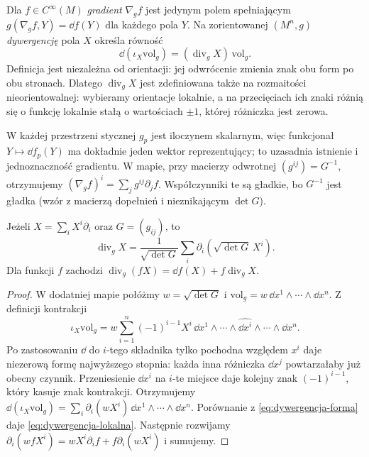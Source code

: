 \begin{definicja}
\label{def:gradient-dywergencja}
Dla $f\in C^\infty(M)$ \emph{gradient} $\nabla_g f$
jest jedynym polem spełniającym
$g(\nabla_g f,Y)=\dd f(Y)$ dla każdego pola $Y$.
Na zorientowanej $(M^n,g)$ \emph{dywergencję}
pola $X$ określa równość
\begin{equation}\label{eq:dywergencja-forma}
 \dd(\iota_X\mathrm{vol}_g)
       =(\operatorname{div}_g X)\,\mathrm{vol}_g.
\end{equation}
Definicja jest niezależna od orientacji:
jej odwrócenie zmienia znak obu form
po obu stronach. Dlatego $\operatorname{div}_gX$
jest zdefiniowana także na rozmaitości
nieorientowalnej: wybieramy orientacje lokalnie, a na
przecięciach ich znaki różnią się o funkcję lokalnie stałą
o wartościach $\pm1$, której różniczka jest zerowa.
\end{definicja}

W każdej przestrzeni stycznej $g_p$ jest
iloczynem skalarnym, więc funkcjonał
$Y\mapsto \dd f_p(Y)$ ma dokładnie jeden
wektor reprezentujący; to uzasadnia
istnienie i jednoznaczność gradientu.
W mapie, przy macierzy odwrotnej
$(g^{ij})=G^{-1}$, otrzymujemy
$(\nabla_gf)^i=\sum_jg^{ij}\partial_jf$.
Współczynniki te są gładkie, bo $G^{-1}$ jest gładka
(wzór z macierzą dopełnień i nieznikającym $\det G$).

\begin{stwierdzenie}
\label{prop:div-lokalnie}
Jeżeli $X=\sum_i X^i\partial_i$ oraz $G=(g_{ij})$,
to
\begin{equation}\label{eq:dywergencja-lokalna}
 \operatorname{div}_gX
 =\frac{1}{\sqrt{\det G}}\sum_i
          \partial_i\!\left(\sqrt{\det G}\,X^i\right).
\end{equation}
Dla funkcji $f$ zachodzi
$\operatorname{div}_g(fX)
=\dd f(X)+f\operatorname{div}_gX$.
\end{stwierdzenie}
\begin{proof}
W dodatniej mapie połóżmy
$w=\sqrt{\det G}$ i
$\mathrm{vol}_g=w\,\dd x^1\wedge\cdots
\wedge\dd x^n$. Z definicji kontrakcji
\[
 \iota_X\mathrm{vol}_g
 =w\sum_{i=1}^n(-1)^{i-1}X^i\,
    \dd x^1\wedge\cdots\wedge
    \widehat{\dd x^i}\wedge\cdots\wedge\dd x^n.
\]
Po zastosowaniu $\dd$ do $i$-tego składnika
tylko pochodna względem $x^i$ daje
niezerową formę najwyższego stopnia:
każda inna różniczka $\dd x^j$ powtarzałaby
już obecny czynnik. Przeniesienie
$\dd x^i$ na $i$-te miejsce daje kolejny
znak $(-1)^{i-1}$, który kasuje znak
kontrakcji. Otrzymujemy
$\dd(\iota_X\mathrm{vol}_g)
=\sum_i\partial_i(wX^i)\,
  \dd x^1\wedge\cdots\wedge\dd x^n$.
Porównanie z \eqref{eq:dywergencja-forma}
daje \eqref{eq:dywergencja-lokalna}.
Następnie rozwijamy
$\partial_i(wfX^i)=wX^i\partial_i f
  +f\partial_i(wX^i)$ i sumujemy.
\end{proof}


